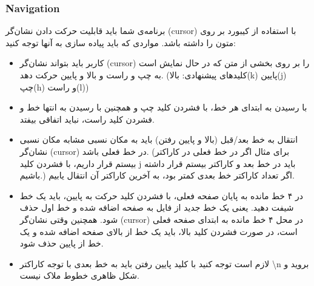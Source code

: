 \subsubsection*{{\titr Navigation}}

برنامه‌ی شما باید قابلیت حرکت دادن نشان‌گر (cursor) با استفاده از کیبورد بر روی متون را داشته باشد. مواردی که باید پیاده سازی به آنها توجه کنید:
\begin{itemize}
    \item کاربر باید بتواند نشان‌گر (cursor) را بر روی بخشی از متن که در حال نمایش است به چپ و راست و بالا و پایین حرکت دهد. (کلیدهای پیشنهادی: بالا(k) پایین(j) چپ(h) و راست(l))
    \item با رسیدن به ابتدای هر خط، با فشردن کلید چپ و همچنین با رسیدن به انتها خط و فشردن کلید راست، نباید اتفاقی بیفتد.
    \item انتقال به خط بعد/قبل (بالا و پایین رفتن) باید به مکان نسبی مشابه مکان نسبی نشان‌گر (cursor) در خط فعلی باشد. (برای مثال اگر در خط فعلی در کاراکتر بیستم قرار داریم، با فشردن کلید j باید در خط بعد و    کاراکتر بیستم قرار داشته باشیم.) اگر تعداد کاراکتر خط بعدی کمتر بود، به آخرین کاراکتر آن انتقال یابیم.
    \item در ۴ خط مانده به پایان صفحه فعلی، با فشردن کلید حرکت به پایین، باید یک خط شیفت دهید. یعنی یک خط جدید از فایل به صفحه اضافه شده و خط اول حذف شود. همچنین وقتی نشان‌گر (cursor) در محل ۴ خط مانده به ابتدای صفحه فعلی است، در صورت فشردن کلید بالا، باید یک خط از بالای صفحه اضافه شده و یک خط از پایین حذف شود.
    \item لازم است توجه کنید با کلید پایین رفتن باید به خط بعدی با توجه کاراکتر \textbackslash n بروید و شکل ظاهری خطوط ملاک نیست.
\end{itemize}
